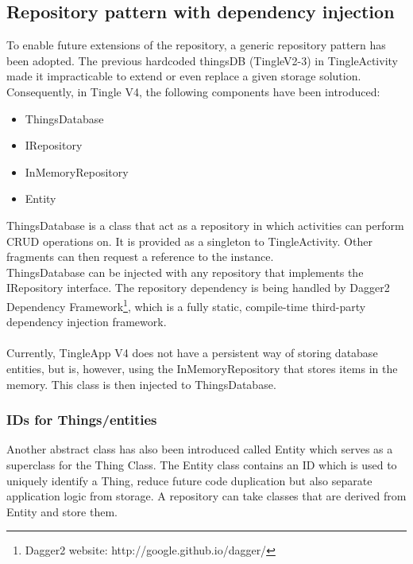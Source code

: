 \documentclass{article}
\begin{document}
\subsection{Repository pattern with dependency injection}
To enable future extensions of the repository, a generic repository pattern has been adopted. The previous hardcoded thingsDB (TingleV2-3) in TingleActivity made it impracticable to extend or  even replace a given storage solution. Consequently, in Tingle V4, the following components have been introduced:
\begin{itemize}
	\item ThingsDatabase
	\item IRepository
	\item InMemoryRepository
	\item Entity
\end{itemize}
ThingsDatabase is a class that act as a repository in which activities  can perform CRUD operations on. It is provided as a singleton to TingleActivity. Other fragments can then request a reference to the instance. \\ThingsDatabase can be injected with any repository that implements the IRepository interface. The repository dependency is being handled by Dagger2 Dependency Framework\footnote{Dagger2 website: http://google.github.io/dagger/}, which is a fully static, compile-time third-party dependency injection framework.\\\\Currently, TingleApp V4 does not have a persistent way of storing database entities, but is, however, using the InMemoryRepository that stores items in the memory. This class is then injected to ThingsDatabase.
\subsubsection{IDs for Things/entities}
Another abstract class has also been introduced called Entity which serves as a superclass for the Thing Class.  The Entity class contains an ID which is used to uniquely identify a Thing, reduce future code duplication but also separate application logic from storage. A repository can take classes that are derived from Entity and store them.
\end{document}
